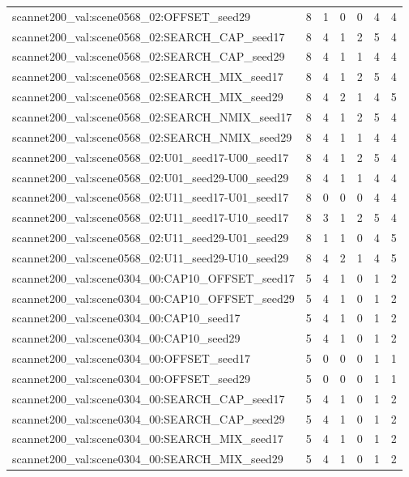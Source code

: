 \begin{table}[t]
\begin{tabular}{lrrrrrr}
scannet200\_val:scene0568\_02:OFFSET\_seed29 & 8 & 1 & 0 & 0 & 4 & 4 \\
scannet200\_val:scene0568\_02:SEARCH\_CAP\_seed17 & 8 & 4 & 1 & 2 & 5 & 4 \\
scannet200\_val:scene0568\_02:SEARCH\_CAP\_seed29 & 8 & 4 & 1 & 1 & 4 & 4 \\
scannet200\_val:scene0568\_02:SEARCH\_MIX\_seed17 & 8 & 4 & 1 & 2 & 5 & 4 \\
scannet200\_val:scene0568\_02:SEARCH\_MIX\_seed29 & 8 & 4 & 2 & 1 & 4 & 5 \\
scannet200\_val:scene0568\_02:SEARCH\_NMIX\_seed17 & 8 & 4 & 1 & 2 & 5 & 4 \\
scannet200\_val:scene0568\_02:SEARCH\_NMIX\_seed29 & 8 & 4 & 1 & 1 & 4 & 4 \\
scannet200\_val:scene0568\_02:U01\_seed17-U00\_seed17 & 8 & 4 & 1 & 2 & 5 & 4 \\
scannet200\_val:scene0568\_02:U01\_seed29-U00\_seed29 & 8 & 4 & 1 & 1 & 4 & 4 \\
scannet200\_val:scene0568\_02:U11\_seed17-U01\_seed17 & 8 & 0 & 0 & 0 & 4 & 4 \\
scannet200\_val:scene0568\_02:U11\_seed17-U10\_seed17 & 8 & 3 & 1 & 2 & 5 & 4 \\
scannet200\_val:scene0568\_02:U11\_seed29-U01\_seed29 & 8 & 1 & 1 & 0 & 4 & 5 \\
scannet200\_val:scene0568\_02:U11\_seed29-U10\_seed29 & 8 & 4 & 2 & 1 & 4 & 5 \\
scannet200\_val:scene0304\_00:CAP10\_OFFSET\_seed17 & 5 & 4 & 1 & 0 & 1 & 2 \\
scannet200\_val:scene0304\_00:CAP10\_OFFSET\_seed29 & 5 & 4 & 1 & 0 & 1 & 2 \\
scannet200\_val:scene0304\_00:CAP10\_seed17 & 5 & 4 & 1 & 0 & 1 & 2 \\
scannet200\_val:scene0304\_00:CAP10\_seed29 & 5 & 4 & 1 & 0 & 1 & 2 \\
scannet200\_val:scene0304\_00:OFFSET\_seed17 & 5 & 0 & 0 & 0 & 1 & 1 \\
scannet200\_val:scene0304\_00:OFFSET\_seed29 & 5 & 0 & 0 & 0 & 1 & 1 \\
scannet200\_val:scene0304\_00:SEARCH\_CAP\_seed17 & 5 & 4 & 1 & 0 & 1 & 2 \\
scannet200\_val:scene0304\_00:SEARCH\_CAP\_seed29 & 5 & 4 & 1 & 0 & 1 & 2 \\
scannet200\_val:scene0304\_00:SEARCH\_MIX\_seed17 & 5 & 4 & 1 & 0 & 1 & 2 \\
scannet200\_val:scene0304\_00:SEARCH\_MIX\_seed29 & 5 & 4 & 1 & 0 & 1 & 2 \\

\end{tabular}
\end{table}
